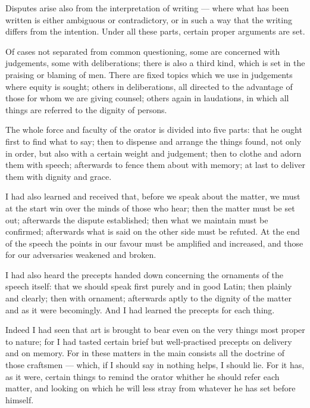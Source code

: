  Disputes arise also from the interpretation of writing — where what has been written is either ambiguous or contradictory, or in such a way that the writing differs from the intention. Under all these parts, certain proper arguments are set.

 Of cases not separated from common questioning, some are concerned with judgements, some with deliberations; there is also a third kind, which is set in the praising or blaming of men. There are fixed topics which we use in judgements where equity is sought; others in deliberations, all directed to the advantage of those for whom we are giving counsel; others again in laudations, in which all things are referred to the dignity of persons.

 The whole force and faculty of the orator is divided into five parts: that he ought first to find what to say; then to dispense and arrange the things found, not only in order, but also with a certain weight and judgement; then to clothe and adorn them with speech; afterwards to fence them about with memory; at last to deliver them with dignity and grace.

 I had also learned and received that, before we speak about the matter, we must at the start win over the minds of those who hear; then the matter must be set out; afterwards the dispute established; then what we maintain must be confirmed; afterwards what is said on the other side must be refuted. At the end of the speech the points in our favour must be amplified and increased, and those for our adversaries weakened and broken.

 I had also heard the precepts handed down concerning the ornaments of the speech itself: that we should speak first purely and in good Latin; then plainly and clearly; then with ornament; afterwards aptly to the dignity of the matter and as it were becomingly. And I had learned the precepts for each thing.

 Indeed I had seen that art is brought to bear even on the very things most proper to nature; for I had tasted certain brief but well-practised precepts on delivery and on memory. For in these matters in the main consists all the doctrine of those craftsmen — which, if I should say in nothing helps, I should lie. For it has, as it were, certain things to remind the orator whither he should refer each matter, and looking on which he will less stray from whatever he has set before himself.

